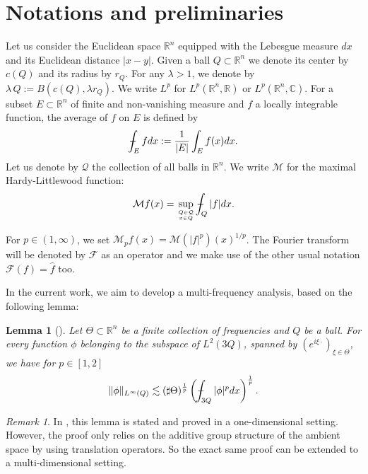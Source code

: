 \documentclass[11pt]{amsart}
\newtheorem{lemma}[theorem]{Lemma}
\theoremstyle{remark}
\newtheorem{remark}{Remark}[section]
\newcommand{\mb}{\medskip\noindent}
\newcommand{\re}{\mathbb{R}}
\newcommand{\rn}{\mathbb{R}^n}
\newcommand{\M}{{\mathcal M}}
\newcommand{\R}{{\mathbb R}}
\def\Xint#1{\mathchoice
   {\XXint\displaystyle\textstyle{#1}}%
   {\XXint\textstyle\scriptstyle{#1}}%
   {\XXint\scriptstyle\scriptscriptstyle{#1}}%
   {\XXint\scriptscriptstyle\scriptscriptstyle{#1}}%
   \!\int}
\def\XXint#1#2#3{{\setbox0=\hbox{$#1{#2#3}{\int}$}
     \vcenter{\hbox{$#2#3$}}\kern-.5\wd0}}
\def\aver#1{\Xint-_{#1}}
\begin{document}
\section{Notations and preliminaries}

Let us consider the Euclidean space $\rn$  equipped with the Lebesgue measure $dx$ and its Euclidean distance $|x-y|$. Given a ball $Q\subset\rn$ we denote its center by $c(Q)$ and its radius by $r_Q$. For any $\lambda>1$, we denote by $\lambda\,Q:=B(c(Q),\lambda r_Q)$.
We write $L^p$ for $L^p(\rn,\re)$ or $L^p(\rn,{\mathbb C})$. For a subset $E\subset \rn$ of finite and non-vanishing measure and $f$ a locally integrable function, the average
of $f$  on $E$ is defined by $$ \aver{E} f dx := \frac{1}{|E|}\int_E f(x) dx.$$
Let us denote by ${\mathcal Q}$ the collection of all balls in $\rn$. We write $\M$ for the maximal Hardy-Littlewood function:
$$
{\mathcal M} f(x)= \sup_{{\genfrac{}{}{0pt}{}{Q\in{\mathcal Q}}{x\in Q}}}  \aver{Q}|f|dx.$$

For $p\in (1,\infty)$, we set $\M_p f(x)=\M(|f|^p)(x)^{1/p}$. The Fourier transform will be denoted by $\mathcal F$ as an operator and we make use of the other usual  notation ${\mathcal F}(f)=\widehat{f}$ too.

\mb

In the current work, we aim to develop a multi-frequency analysis, based on the following lemma:
\begin{lemma}[\cite{BE}] \label{lem} Let $\Theta\subset \R^n$ be a finite collection of frequencies and $Q$ be a ball. For every function $\phi$ belonging to the subspace of $L^2(3Q)$, spanned by $(e^{i\xi\cdot})_{\xi\in \Theta}$, we have for $p\in[1,2]$
\begin{equation}  \|\phi\|_{L^\infty(Q)} \lesssim (\sharp \Theta)^{\frac{1}{p}} \left(\aver{3Q} |\phi|^p dx \right)^{\frac{1}{p}}. \label{aze} \end{equation}
\end{lemma}

\begin{remark} In \cite{BE}, this lemma is stated and proved in a one-dimensional setting. However, the proof only relies on the additive group structure of the ambient space by using translation operators. So the exact same proof can be extended to a multi-dimensional setting.
\end{remark}
\end{document}

